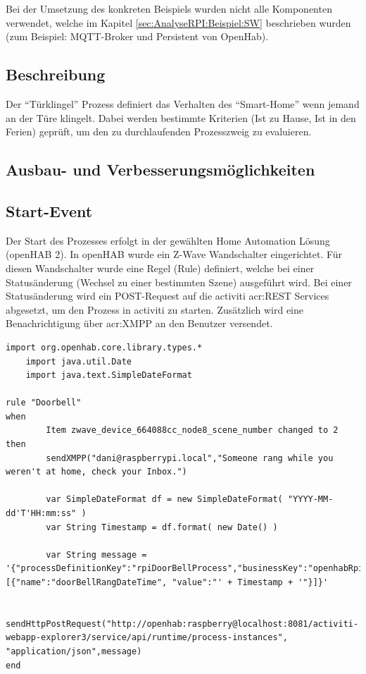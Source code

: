 Bei der Umsetzung des konkreten Beispiels wurden nicht alle Komponenten verwendet, welche im Kapitel \ref{sec:AnalyseRPI:Beispiel:SW}  beschrieben wurden (zum Beispiel: MQTT-Broker und Persistent von OpenHab).

\subsection{Beschreibung}
Der "`Türklingel"' Prozess definiert das Verhalten des "`Smart-Home"' wenn jemand an der Türe klingelt. Dabei werden bestimmte Kriterien (Ist zu Hause, Ist in den Ferien) geprüft, um den zu durchlaufenden Prozesszweig zu evaluieren.

\subsection{Ausbau- und Verbesserungsmöglichkeiten}

\subsection{Start-Event}
Der Start des Prozesses erfolgt in der gewählten Home Automation Lösung (openHAB 2). In openHAB wurde ein Z-Wave Wandschalter eingerichtet. Für diesen Wandschalter wurde eine Regel (Rule) definiert, welche bei einer Statusänderung (Wechsel zu einer bestimmten Szene) ausgeführt wird. Bei einer Statusänderung wird ein POST-Request auf die activiti \gls{acr:REST} Services abgesetzt, um den Prozess in activiti zu starten. Zusätzlich wird eine Benachrichtigung über \gls{acr:XMPP} an den Benutzer versendet.

\begin{lstlisting}[caption=Die definierte "`Doorbell"' Regel.]
    import org.openhab.core.library.types.*
    import java.util.Date
    import java.text.SimpleDateFormat

rule "Doorbell"
when
        Item zwave_device_664088cc_node8_scene_number changed to 2
then
        sendXMPP("dani@raspberrypi.local","Someone rang while you weren't at home, check your Inbox.")

        var SimpleDateFormat df = new SimpleDateFormat( "YYYY-MM-dd'T'HH:mm:ss" )
        var String Timestamp = df.format( new Date() )

        var String message = '{"processDefinitionKey":"rpiDoorBellProcess","businessKey":"openhabRpi","variables": [{"name":"doorBellRangDateTime", "value":"' + Timestamp + '"}]}'

        sendHttpPostRequest("http://openhab:raspberry@localhost:8081/activiti-webapp-explorer3/service/api/runtime/process-instances", "application/json",message)
end

\end{lstlisting}

